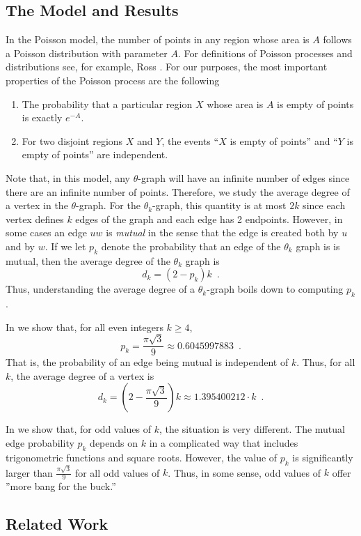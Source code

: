 \documentclass{patmorin}
\begin{document}
\subsection{The Model and Results}

In the Poisson model, the number of points in any region
whose area is $A$ follows a Poisson distribution with parameter $A$.
For definitions of Poisson processes and distributions see, for example,
Ross \cite[Chapter~2]{ross:introduction}.  For our purposes, the most
important properties of the Poisson process are the following
\begin{enumerate}
\item The probability  that a particular region $X$ whose area is $A$
   is empty of points is exactly $e^{-A}$.
\item For two disjoint regions $X$ and $Y$, the events ``$X$ is empty
   of points'' and ``$Y$ is empty of points'' are independent.
\end{enumerate}
Note that, in this model, any $\theta$-graph will have an infinite number
of edges since there are an infinite number of points.  Therefore,
we study the average degree of a vertex in the $\theta$-graph.  For the
$\theta_k$-graph, this quantity is at most $2k$ since each vertex defines
$k$ edges of the graph and each edge has 2 endpoints.  However, in some
cases an edge $uw$ is \emph{mutual} in the sense that the edge is created
both by $u$ and by $w$.  If we let $p_k$ denote the probability that an
edge of the $\theta_k$ graph is is mutual, then the average degree of
the $\theta_k$ graph is
\[
    d_k = (2-p_k)k \enspace .
\]
Thus, understanding the average degree of a $\theta_k$-graph boils down
to computing $p_k$.

In  we show that, for all even integers $k\ge 4$,
\[
    p_k=\frac{\pi\sqrt{3}}{9}\approx 0.6045997883 \enspace .
\]
That is, the probability of an edge being mutual is independent of $k$. Thus, for all $k$, the average degree of a vertex is 
\[
  d_k = \left(2-\frac{\pi\sqrt{3}}{9}\right)k \approx 1.395400212\cdot k \enspace .
\]

In  we show that, for odd values of $k$, the situation
is very different.  The mutual edge probability $p_k$ depends on $k$
in a complicated way that includes trigonometric functions and square
roots.  However, the value of $p_k$ is significantly larger than
$\frac{\pi\sqrt{3}}{9}$ for all odd values of $k$.  Thus, in some sense,
odd values of $k$ offer ''more bang for the buck.''

\subsection{Related Work}
\end{document}
